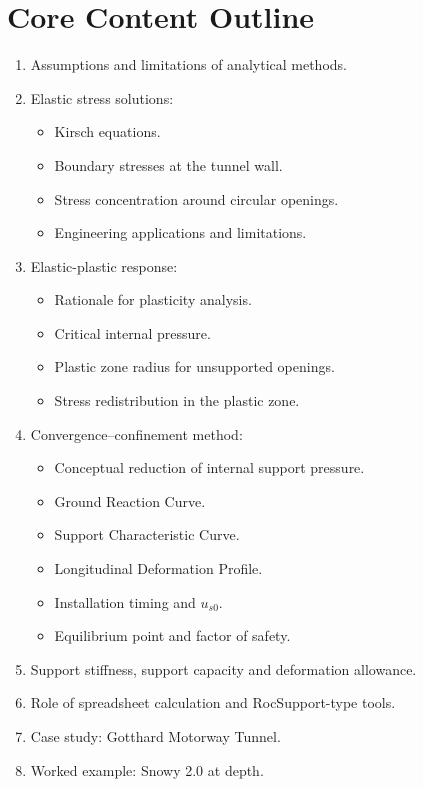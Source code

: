 \documentclass[12pt,oneside]{book}
\begin{document}
\section{Core Content Outline}
\begin{enumerate}
    \item Assumptions and limitations of analytical methods.
    \item Elastic stress solutions:
    \begin{itemize}
        \item Kirsch equations.
        \item Boundary stresses at the tunnel wall.
        \item Stress concentration around circular openings.
        \item Engineering applications and limitations.
    \end{itemize}
    \item Elastic-plastic response:
    \begin{itemize}
        \item Rationale for plasticity analysis.
        \item Critical internal pressure.
        \item Plastic zone radius for unsupported openings.
        \item Stress redistribution in the plastic zone.
    \end{itemize}
    \item Convergence--confinement method:
    \begin{itemize}
        \item Conceptual reduction of internal support pressure.
        \item Ground Reaction Curve.
        \item Support Characteristic Curve.
        \item Longitudinal Deformation Profile.
        \item Installation timing and \(u_{s0}\).
        \item Equilibrium point and factor of safety.
    \end{itemize}
    \item Support stiffness, support capacity and deformation allowance.
    \item Role of spreadsheet calculation and RocSupport-type tools.
    \item Case study: Gotthard Motorway Tunnel.
    \item Worked example: Snowy 2.0 at depth.
\end{enumerate}
\end{document}

